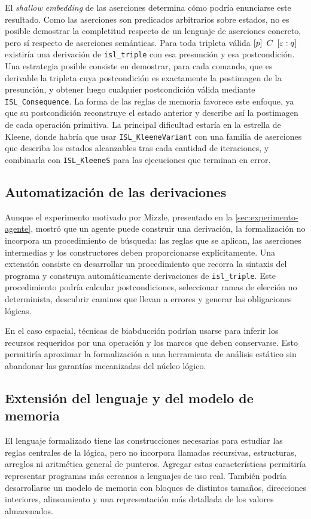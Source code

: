 \documentclass[a4paper,	11pt]{report}
\begin{document}
El \emph{shallow embedding} de las aserciones determina cómo podría enunciarse este resultado.
Como las aserciones son predicados arbitrarios sobre estados,
no es posible demostrar la completitud respecto de un lenguaje de aserciones concreto,
pero sí respecto de aserciones semánticas.
Para toda tripleta válida $\left\lbrack p \right\rbrack~C~\left\lbrack \varepsilon : q \right\rbrack$ existiría una derivación de \lstinline|isl_triple| con esa presunción y esa postcondición.
Una estrategia posible consiste en demostrar,
para cada comando,
que es derivable la tripleta cuya postcondición es exactamente la postimagen de la presunción,
y obtener luego cualquier postcondición válida mediante \lstinline|ISL_Consequence|.
La forma de las reglas de memoria favorece este enfoque,
ya que su postcondición reconstruye el estado anterior y describe así la postimagen de cada operación primitiva.
La principal dificultad estaría en la estrella de Kleene,
donde habría que usar \lstinline|ISL_KleeneVariant| con una familia de aserciones que describa los estados alcanzables tras cada cantidad de iteraciones,
y combinarla con \lstinline|ISL_KleeneS| para las ejecuciones que terminan en error.

\subsection*{Automatización de las derivaciones}
Aunque el experimento motivado por Mizzle,
presentado en la \autoref{sec:experimento-agente},
mostró que un agente puede construir una derivación,
la formalización no incorpora un procedimiento de búsqueda:
las reglas que se aplican,
las aserciones intermedias y los constructores deben proporcionarse explícitamente.
Una extensión consiste en desarrollar un procedimiento que recorra la sintaxis del programa y construya automáticamente derivaciones de \lstinline|isl_triple|.
Este procedimiento podría calcular postcondiciones,
seleccionar ramas de elección no determinista,
descubrir caminos que llevan a errores y generar las obligaciones lógicas.

En el caso espacial,
técnicas de biabducción \citep{biabd} podrían usarse para inferir los recursos requeridos por una operación y los marcos que deben conservarse.
Esto permitiría aproximar la formalización a una herramienta de análisis estático sin abandonar las garantías mecanizadas del núcleo lógico.

\subsection*{Extensión del lenguaje y del modelo de memoria}
El lenguaje formalizado tiene las construcciones necesarias para estudiar las reglas centrales de la lógica,
pero no incorpora llamadas recursivas,
estructuras,
arreglos ni aritmética general de punteros.
Agregar estas características permitiría representar programas más cercanos a lenguajes de uso real.
También podría desarrollarse un modelo de memoria con bloques de distintos tamaños,
direcciones interiores,
alineamiento y una representación más detallada de los valores almacenados.
\end{document}
